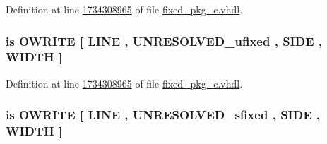 Definition at line \hyperlink{fixed__pkg__c_8vhdl_source_l1734308965}{1734308965} of file \hyperlink{fixed__pkg__c_8vhdl_source}{fixed\+\_\+pkg\+\_\+c.\+vhdl}.

\hypertarget{classfixed__pkg_af7bf14320656c70f9260aecbff34ecea}{}
\subsubsection[{O\+C\+T\+A\+L\+\_\+\+W\+R\+I\+T\+E}]{ {\bfseries \textcolor{keywordflow}{is}\textcolor{vhdlchar}{ }\textcolor{vhdlchar}{O\+W\+R\+I\+T\+E}\textcolor{vhdlchar}{ }\textcolor{vhdlchar}{\mbox{[}}\textcolor{vhdlchar}{ }\textcolor{vhdlchar}{L\+I\+N\+E}\textcolor{vhdlchar}{ }\textcolor{vhdlchar}{,}\textcolor{vhdlchar}{ }{\bfseries {\bf U\+N\+R\+E\+S\+O\+L\+V\+E\+D\+\_\+ufixed}} \textcolor{vhdlchar}{ }\textcolor{vhdlchar}{,}\textcolor{vhdlchar}{ }\textcolor{vhdlchar}{S\+I\+D\+E}\textcolor{vhdlchar}{ }\textcolor{vhdlchar}{,}\textcolor{vhdlchar}{ }\textcolor{vhdlchar}{W\+I\+D\+T\+H}\textcolor{vhdlchar}{ }\textcolor{vhdlchar}{\mbox{]}}\textcolor{vhdlchar}{ }} \hspace{0.3cm}{\ttfamily [Alias]}}\label{classfixed__pkg_af7bf14320656c70f9260aecbff34ecea}


Definition at line \hyperlink{fixed__pkg__c_8vhdl_source_l1734308965}{1734308965} of file \hyperlink{fixed__pkg__c_8vhdl_source}{fixed\+\_\+pkg\+\_\+c.\+vhdl}.

\hypertarget{classfixed__pkg_a8d2e6245c720509e99289ab1f28d13b2}{}
\subsubsection[{O\+C\+T\+A\+L\+\_\+\+W\+R\+I\+T\+E}]{ {\bfseries \textcolor{keywordflow}{is}\textcolor{vhdlchar}{ }\textcolor{vhdlchar}{O\+W\+R\+I\+T\+E}\textcolor{vhdlchar}{ }\textcolor{vhdlchar}{\mbox{[}}\textcolor{vhdlchar}{ }\textcolor{vhdlchar}{L\+I\+N\+E}\textcolor{vhdlchar}{ }\textcolor{vhdlchar}{,}\textcolor{vhdlchar}{ }{\bfseries {\bf U\+N\+R\+E\+S\+O\+L\+V\+E\+D\+\_\+sfixed}} \textcolor{vhdlchar}{ }\textcolor{vhdlchar}{,}\textcolor{vhdlchar}{ }\textcolor{vhdlchar}{S\+I\+D\+E}\textcolor{vhdlchar}{ }\textcolor{vhdlchar}{,}\textcolor{vhdlchar}{ }\textcolor{vhdlchar}{W\+I\+D\+T\+H}\textcolor{vhdlchar}{ }\textcolor{vhdlchar}{\mbox{]}}\textcolor{vhdlchar}{ }} \hspace{0.3cm}{\ttfamily [Alias]}}\label{classfixed__pkg_a8d2e6245c720509e99289ab1f28d13b2}


